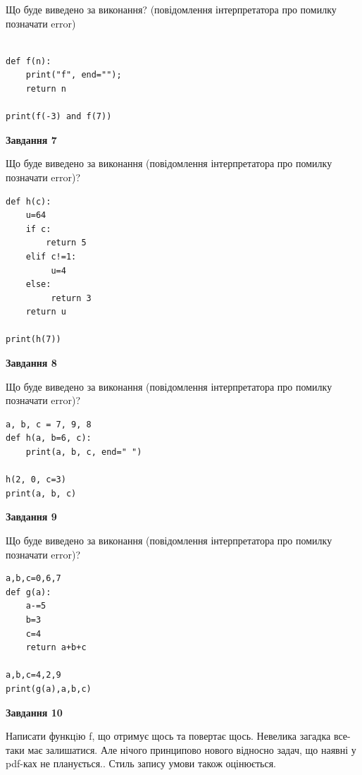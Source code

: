 \documentclass[12pt, ukrainian]{article}
\begin{document}
{\begin {large}
Що буде виведено за виконання? (повідомлення інтерпретатора про помилку позначати error)\par
\begin{verbatim}

def f(n):
    print("f", end="");
    return n

print(f(-3) and f(7))
\end{verbatim}

{\begin {center}\textbf{Завдання 7}\end {center}}

Що буде виведено за виконання (повідомлення інтерпретатора про помилку позначати error)?\par
\begin{verbatim}
def h(c):
    u=64
    if c: 
        return 5
    elif c!=1:
         u=4
    else:
         return 3
    return u

print(h(7))
\end{verbatim}

{\begin {center}\textbf{Завдання 8}\end {center}}

Що буде виведено за виконання (повідомлення інтерпретатора про помилку позначати error)?\par
\begin{verbatim}
a, b, c = 7, 9, 8
def h(a, b=6, c):
    print(a, b, c, end=" ")

h(2, 0, c=3)
print(a, b, c)
\end{verbatim}

{\begin {center}\textbf{Завдання 9}\end {center}}

Що буде виведено за виконання (повідомлення інтерпретатора про помилку позначати error)?\par
\begin{verbatim}
a,b,c=0,6,7
def g(a):
    a-=5
    b=3
    c=4
    return a+b+c

a,b,c=4,2,9
print(g(a),a,b,c)
\end{verbatim}

{\begin {center}\textbf{Завдання 10}\end {center}}


Написати функцiю f, що отримує щось та повертає щось. Невелика загадка все-таки має залишатися. Але нічого принципово нового відносно задач, що наявні у pdf-ках не планується.. Стиль запису умови також оцінюється.\par
\end {large}}
\newpage
\end{document}
